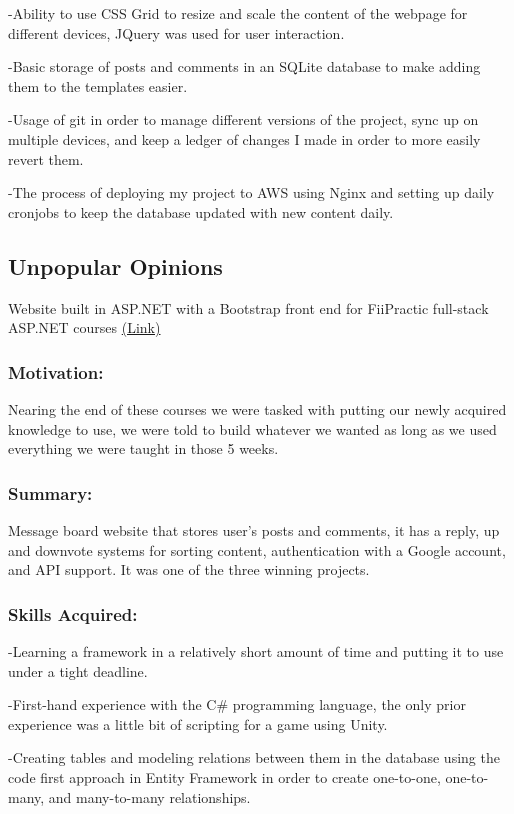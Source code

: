 \documentclass[a4paper,hidelinks,11pt]{article}
\begin{document}
-Ability to use CSS Grid to resize and scale the content of the webpage for different devices, JQuery was used
for user interaction.

-Basic storage of posts and comments in an SQLite database to make adding them to the templates easier.

-Usage of git in order to manage different versions of the project, sync up on multiple devices, and keep a
ledger of changes I made in order to more easily revert them.

-The process of deploying my project to AWS using Nginx and setting up daily cronjobs to keep the database updated with new
content daily.

\subsection{Unpopular Opinions}
Website built in ASP.NET with a Bootstrap front end for FiiPractic full-stack ASP.NET courses \href{https://github.com/IureaMarius/UnpopularOpinions}{(Link)}
\subsubsection{Motivation:}
Nearing the end of these courses we were tasked with putting our newly acquired knowledge to use, we were told
to build whatever we wanted as long as we used everything we were taught in those 5 weeks. 
\subsubsection{Summary:}
Message board website that stores user's posts and comments, it has a reply, up and downvote systems for sorting
content, authentication with a Google account, and API support. It was one of the three winning projects.
\subsubsection{Skills Acquired:}

-Learning a framework in a relatively short amount of time and putting it to use under a tight deadline.

-First-hand experience with the C\# programming language, the only prior experience was a little bit of 
scripting for a game using Unity.

-Creating tables and modeling relations between them in the database using the code first approach in Entity
Framework in order to create one-to-one, one-to-many, and many-to-many relationships.
\end{document}
